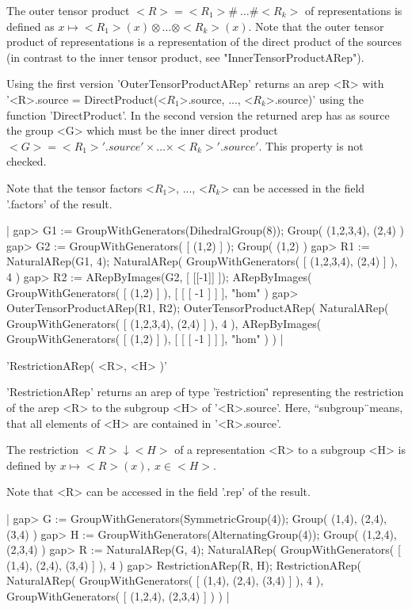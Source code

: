 The outer tensor product $<R> = <R_1>\#\ \dots\# <R_k>$ of 
representations is
defined as $x\mapsto <R_1>(x)\otimes\dots\otimes <R_k>(x)$.
Note that the outer tensor product of representations 
is a representation of the direct product of the sources 
(in contrast to the inner tensor product, see "InnerTensorProductARep").

Using the first version 'OuterTensorProductARep' returns an arep <R> with
'<R>.source = DirectProduct(<$R_1$>.source, ..., <$R_k$>.source)' 
using the {\GAP} function 'DirectProduct'. In the second version
the returned arep has as source the group <G> which must be the inner 
direct product $<G> = <R_1>'.source'\times\dots\times<R_k>'.source'$. 
This property is not checked. 

Note that the tensor factors <$R_1$>, ..., <$R_k$> can be accessed 
in the field '.factors' of the result.

|    gap> G1 := GroupWithGenerators(DihedralGroup(8));
    Group( (1,2,3,4), (2,4) )
    gap> G2 := GroupWithGenerators( [ (1,2) ] );
    Group( (1,2) )
    gap> R1 := NaturalARep(G1, 4);
    NaturalARep( GroupWithGenerators( [ (1,2,3,4), (2,4) ] ), 4 )
    gap> R2 := ARepByImages(G2, [ [[-1]] ]);
    ARepByImages(
      GroupWithGenerators( [ (1,2) ] ),
      [ [ [ -1 ] ] ],
      "hom"
    )
    gap> OuterTensorProductARep(R1, R2);
    OuterTensorProductARep(
      NaturalARep( GroupWithGenerators( [ (1,2,3,4), (2,4) ] ), 4 ),
      ARepByImages(
        GroupWithGenerators( [ (1,2) ] ),
        [ [ [ -1 ] ] ],
        "hom"
      )
    ) |


'RestrictionARep( <R>, <H> )'

'RestrictionARep' returns an arep of type '\"restriction\"' 
representing the restriction of the arep <R> to 
the subgroup <H> of '<R>.source'. Here, ``subgroup\"\ means, 
that all elements of <H> are contained in '<R>.source'.

The restriction $<R>\downarrow <H>$ of a representation <R> 
to a subgroup <H> is defined by $x\mapsto <R>(x),\ x\in <H>$.

Note that <R> can be accessed in the field '.rep' of the result.

|    gap> G := GroupWithGenerators(SymmetricGroup(4));
    Group( (1,4), (2,4), (3,4) )
    gap> H := GroupWithGenerators(AlternatingGroup(4));
    Group( (1,2,4), (2,3,4) )
    gap> R := NaturalARep(G, 4);
    NaturalARep( GroupWithGenerators( [ (1,4), (2,4), (3,4) ] ), 4 )
    gap> RestrictionARep(R, H);
    RestrictionARep(
      NaturalARep( GroupWithGenerators( [ (1,4), (2,4), (3,4) ] ), 4 ),
      GroupWithGenerators( [ (1,2,4), (2,3,4) ] )
    ) |

